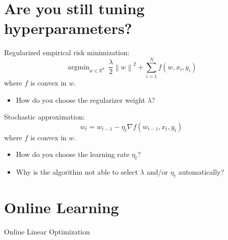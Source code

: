 \documentclass[largefonts,landscape]{sciposter}
\DeclareMathOperator*{\argmin}{argmin}
\newcommand{\R}{\mathbb{R}}
\newcommand{\norm}[1]{\left\|#1\right\|}
\newcommand{\grad}{\nabla}
\begin{document}
\setlength{\parindent}{0em}
\setlength{\columnsep}{4cm}
\begin{multicols}{3}

\section*{Are you still tuning hyperparameters?}

Regularized empirical risk minimization:
\begin{equation}
\label{equation:objective-function}
    \argmin_{w \in \R^d} \ \frac{\lambda}{2} \norm{w}^2 + \sum_{i=1}^N f(w, x_i, y_i)
\end{equation}
where $f$ is convex in $w$.
\begin{itemize}
\item How do you choose the regularizer weight $\lambda$?
\end{itemize}

\vspace{1cm}

Stochastic approximation:
\begin{equation}
\label{equation:objective-function-sa}
    w_t = w_{t-1} - \eta_t \grad f(w_{t-1}, x_t, y_t)
\end{equation}
where $f$ is convex in $w$.
\begin{itemize}
\item How do you choose the learning rate $\eta_t$?
\end{itemize}

\vspace{1cm}

\begin{itemize}
\item Why is the algorithm not able to select $\lambda$ and/or $\eta_t$ automatically?
\end{itemize}

\section*{Online Learning}


\setlength{\fboxrule}{5pt}
\setlength{\fboxsep}{10pt}
\begin{center}
Online Linear Optimization
\vspace{0.3cm}

\colorbox[rgb]{0.80,0.55,0.98}{}
\end{center}


\end{multicols}
\end{document}
